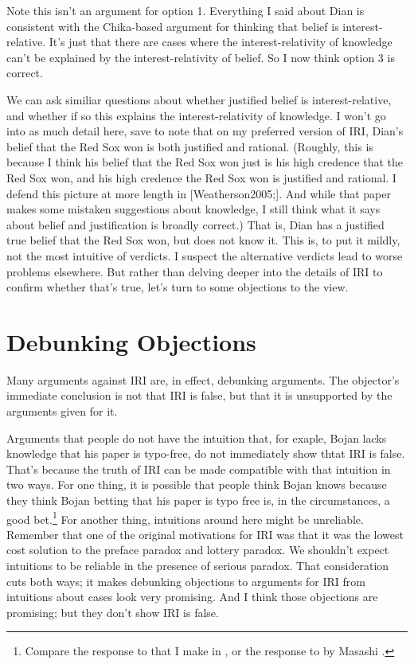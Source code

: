 Note this isn't an argument for option 1. Everything I said about Dian is consistent with the Chika-based argument for thinking that belief is interest-relative. It's just that there are cases where the interest-relativity of knowledge can't be explained by the interest-relativity of belief. So I now think option 3 is correct.

We can ask similiar questions about whether justified belief is interest-relative, and whether if so this explains the interest-relativity of knowledge. I won't go into as much detail here, save to note that on my preferred version of IRI, Dian's belief that the Red Sox won is both justified and rational. (Roughly, this is because I think his belief that the Red Sox won just is his high credence that the Red Sox won, and his high credence the Red Sox won is justified and rational. I defend this picture at more length in [Weatherson2005;]. And while that paper makes some mistaken suggestions about knowledge, I still think what it says about belief and justification is broadly correct.) That is, Dian has a justified true belief that the Red Sox won, but does not know it. This is, to put it mildly, not the most intuitive of verdicts. I suspect the alternative verdicts lead to worse problems elsewhere. But rather than delving deeper into the details of IRI to confirm whether that's true, let's turn to some objections to the view.

\section{Debunking Objections}
\label{debunkingobjections}

Many arguments against IRI are, in effect, debunking arguments. The objector's immediate conclusion is not that IRI is false, but that it is unsupported by the arguments given for it. 

Arguments that people do not have the intuition that, for exaple, Bojan lacks knowledge that his paper is typo-free, do not immediately show thtat IRI is false. That's because the truth of IRI can be made compatible with that intuition in two ways. For one thing, it is possible that people think Bojan knows because they think Bojan betting that his paper is typo free is, in the circumstances, a good bet.\footnote{Compare the response to  \citet{FeltzZarpentine2010} that I make in  \citet[§1]{Weatherson2011-WEADIR}, or the response to  \citet{Lackey2010} by Masashi  \citet[§5]{Kasaki2014}.} For another thing, intuitions around here might be unreliable. Remember that one of the original motivations for IRI was that it was the lowest cost solution to the preface paradox and lottery paradox. We shouldn't expect intuitions to be reliable in the presence of serious paradox. That consideration cuts both ways; it makes debunking objections to arguments for IRI from intuitions about cases look very promising. And I think those objections are promising; but they don't show IRI is false.


